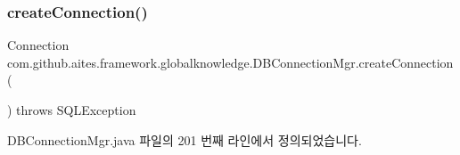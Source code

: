 \subsubsection{\texorpdfstring{create\+Connection()}{createConnection()}\hspace{0.1cm}{\footnotesize\ttfamily [1/2]}}
{\footnotesize\ttfamily Connection com.\+github.\+aites.\+framework.\+globalknowledge.\+D\+B\+Connection\+Mgr.\+create\+Connection (\begin{DoxyParamCaption}{ }\end{DoxyParamCaption}) throws S\+Q\+L\+Exception\hspace{0.3cm}{\ttfamily [private]}}



D\+B\+Connection\+Mgr.\+java 파일의 201 번째 라인에서 정의되었습니다.


